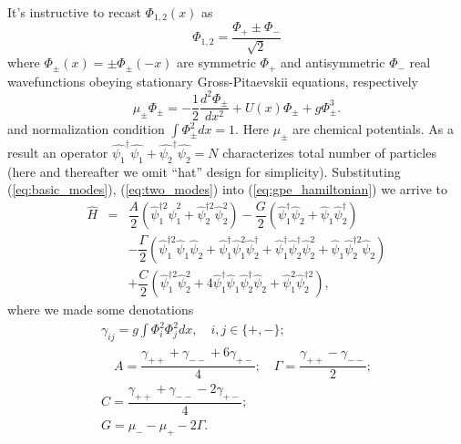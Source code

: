 \documentclass[aps, pre, preprint, groupedaddress, superscriptaddress, showkeys, showpacs] {revtex4-1}
\begin{document}
It's instructive to recast $\Phi_{1,2}(x)$ as
%
\begin{equation}
\Phi_{1,2} = \dfrac{\Phi_+ \pm \Phi_-}{\sqrt{2}}
\label{eq:basic_modes}
\end{equation}
%
where $\Phi_{\pm}(x) = \pm \Phi_{\pm}(-x)$ are symmetric $\Phi_+$ and antisymmetric $\Phi_-$ real wavefunctions obeying stationary Gross-Pitaevskii equations, respectively
%
\begin{equation}
\mu_{\pm} \Phi_{\pm} = -\dfrac{1}{2} \dfrac{d^2 \Phi_{\pm}}{dx^2} + U(x) \Phi_{\pm} + g \Phi_{\pm}^3.
\label{eq:stationary}
\end{equation}
%
and normalization condition $\int \Phi_{\pm}^2 dx = 1$.
Here $\mu_{\pm}$ are chemical potentials.
As a result an operator $\hat{\psi_1}^\dag\hat{\psi_1} + \hat{\psi_2}^\dag\hat{\psi_2} = N$ characterizes total number of particles (here and thereafter we omit ``hat'' design for simplicity).
Substituting (\ref{eq:basic_modes}), (\ref{eq:two_modes}) into (\ref{eq:gpe_hamiltonian}) we arrive to
% 
\begin{equation}
\begin{array}{lcl}
\hat{H} & = & \dfrac{A}{2} (\hat{\psi}_1^{\dag 2} \hat{\psi}_1^2 + \hat{\psi}_2^{\dag 2} \hat{\psi}_2^2) - \dfrac{G}{2} (\hat{\psi}_1^\dag \hat{\psi}_2 + \hat{\psi}_1 \hat{\psi}_2^\dag) \\ [8pt]
& & -\dfrac{\Gamma}{2} (\hat{\psi}_1^{\dag 2} \hat{\psi}_1 \hat{\psi}_2 + \hat{\psi}_1^\dag \hat{\psi}_1^2 \hat{\psi}_2^\dag + \hat{\psi}_1^\dag \hat{\psi}_2^\dag \hat{\psi}_2^2 + \hat{\psi}_1 \hat{\psi}_2^{\dag 2} \hat{\psi}_2) \\ [8pt]
& & +\dfrac{C}{2} (\hat{\psi}_1^{\dag 2} \hat{\psi}_2^2 + 4 \hat{\psi}_1^\dag \hat{\psi}_1 \hat{\psi}_2^\dag \hat{\psi}_2 + \hat{\psi}_1^2 \hat{\psi}_2^{\dag 2}),
\end{array}
\label{eq:hamiltonian}
\end{equation}
%
where we made some denotations
%
\begin{equation}
\begin{array}{c}
\gamma_{ij} = g \int \Phi_i^2 \Phi_j^2 dx, \quad i,j \in \{+,-\}; \\
\quad A = \dfrac{\gamma_{++} + \gamma_{--} + 6 \gamma_{+-}}{4}; \quad \Gamma = \dfrac{\gamma_{++} - \gamma_{--}}{2}; \\
C = \dfrac{\gamma_{++} + \gamma_{--} - 2\gamma_{+-}}{4}; \\
G = \mu_- - \mu_+ - 2\Gamma.
\end{array}
\label{eq:subs}
\end{equation}
%
\end{document}
